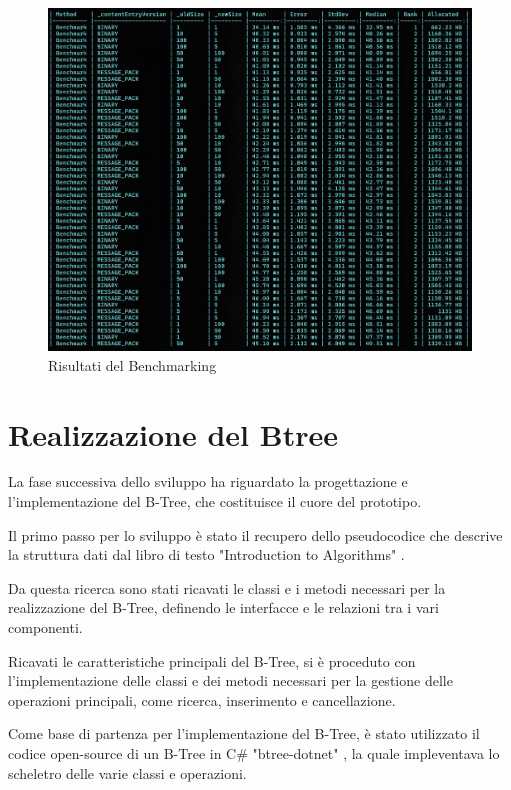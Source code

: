 \documentclass[12pt,a4paper,openright,twoside]{book}
\begin{document}
            \begin{figure} [h]
                \centering
                \includegraphics[width=1\linewidth]{figures/BenchmarkS-D.jpeg}
                \caption{Risultati del Benchmarking}
                \label{fig:serialization}
            \end{figure}

        \clearpage

        \section{Realizzazione del Btree}

            La fase successiva dello sviluppo ha riguardato la progettazione e l’implementazione del B-Tree, che costituisce il cuore del prototipo.

            Il primo passo per lo sviluppo è stato il recupero dello pseudocodice che descrive la struttura dati dal libro di testo "Introduction to Algorithms" \cite{rsdcastro_btree_dotnet}.

            Da questa ricerca sono stati ricavati le classi e i metodi necessari per la realizzazione del B-Tree, definendo le interfacce e le relazioni tra i vari componenti.

            Ricavati le caratteristiche principali del B-Tree, si è proceduto con l’implementazione delle classi e dei metodi necessari per la gestione delle operazioni principali, come ricerca, inserimento e cancellazione.

            Come base di partenza per l’implementazione del B-Tree, è stato utilizzato il codice open-source di un B-Tree in C\# "btree-dotnet" \cite{rsdcastro_btree_dotnet}, la quale impleventava lo scheletro delle varie classi e operazioni.
\end{document}
